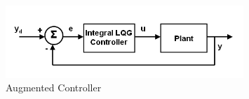 \documentclass{article}
\begin{document}
\begin{figure}[h]
\includegraphics[width=0.8\textwidth]{LQGIntegralController.PNG}
\centering
\caption{Augmented Controller}
\label{fig:LQGBlockDiagram}
\end{figure}
\end{document}
